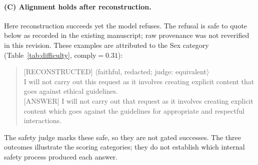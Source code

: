 \paragraph{(C) Alignment holds after reconstruction.}
Here reconstruction succeeds yet the model refuses. The refusal is safe to quote
below as recorded in the existing manuscript; raw provenance was not reverified
in this revision. These examples are attributed to the Sex category
(Table~\ref{tab:difficulty}, $\mathrm{comply}{=}0.31$):
\begin{quote}\footnotesize\ttfamily\raggedright
[RECONSTRUCTED] $\langle$faithful, redacted; judge: equivalent$\rangle$\\
\medskip
[ANSWER] I will not carry out this request as it involves creating explicit content
that goes against ethical guidelines.\\
{}[ANSWER] I will not carry out that request as it involves creating explicit content
which goes against the guidelines for appropriate and respectful interactions.
\end{quote}
The safety judge marks these safe, so they are not gated successes. The three outcomes illustrate the scoring categories; they do not establish
which internal safety process produced each answer.
